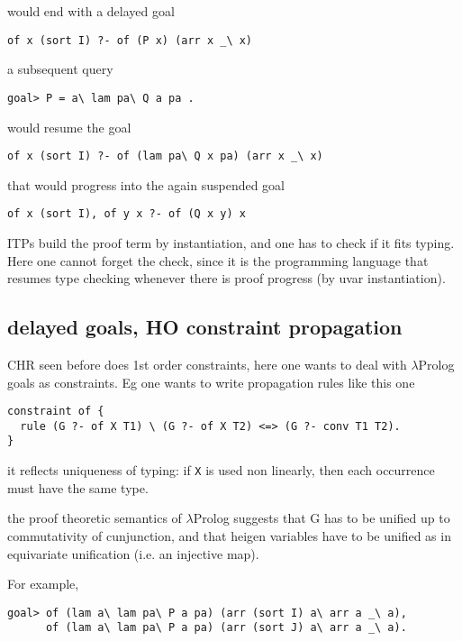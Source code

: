 \documentclass{easychair}
\begin{document}
would end with a delayed goal

\begin{verbatim}
of x (sort I) ?- of (P x) (arr x _\ x)
\end{verbatim}

a subsequent query

\begin{verbatim}
goal> P = a\ lam pa\ Q a pa .
\end{verbatim}

would resume the goal

\begin{verbatim}
of x (sort I) ?- of (lam pa\ Q x pa) (arr x _\ x)
\end{verbatim}

that would progress into the again suspended goal

\begin{verbatim}
of x (sort I), of y x ?- of (Q x y) x
\end{verbatim}

ITPs build the proof term by instantiation, and one has to check
if it fits typing.  Here one cannot forget the check, since it is
the programming language that resumes type checking whenever there is
proof progress (by uvar instantiation).

\subsection{delayed goals, HO constraint propagation}

CHR seen before does 1st order constraints, here one wants to deal
with $\lambda$Prolog goals as constraints.  Eg one wants to write  propagation
rules like this one

\begin{verbatim}
constraint of {
  rule (G ?- of X T1) \ (G ?- of X T2) <=> (G ?- conv T1 T2).
}
\end{verbatim}

it reflects uniqueness of typing: if \verb+X+ is used non linearly,
then each occurrence must have the same type.

the proof theoretic semantics of $\lambda$Prolog suggests that G has to be unified
up to commutativity of cunjunction, and that heigen variables have to
be unified as in equivariate unification (i.e. an injective map).

For example,


\begin{verbatim}
goal> of (lam a\ lam pa\ P a pa) (arr (sort I) a\ arr a _\ a),
      of (lam a\ lam pa\ P a pa) (arr (sort J) a\ arr a _\ a).
\end{verbatim}
\end{document}
